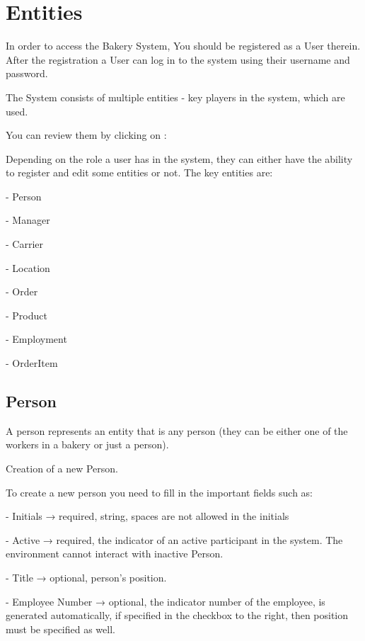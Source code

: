 \section{Entities}\label{sec:01}
In order to access the Bakery System, You should be registered as a User therein. 
After the registration a User can log in to the system using their username and password. 

The System consists of multiple entities - key players in the system, which are used.

You can review them by clicking on :

Depending on the role a user has in the system, they can either have the ability to register and edit some entities or not. 
The key entities are:

- Person 

- Manager

- Carrier

- Location

- Order

- Product

- Employment

- OrderItem

\subsection{Person}
A person represents an entity that is any person (they can be either one of the workers in a bakery or just a person).

Creation of a new Person.

To create a new person you need to  fill in the important fields such as:

- Initials →  required, string, spaces are not allowed in the initials

- Active → required, the indicator of an active participant in the system. The environment cannot interact with inactive Person.

- Title →  optional, person’s position.

- Employee Number → optional,  the indicator number of the employee, is generated automatically, if specified in the checkbox to the right, then position must be specified as well. 

